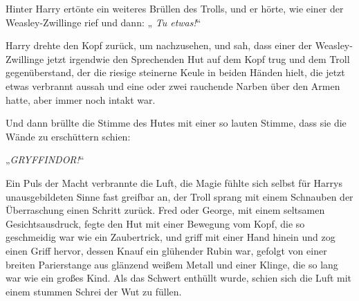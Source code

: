 Hinter Harry ertönte ein weiteres Brüllen des Trolls, und er hörte, wie einer der Weasley-Zwillinge  rief und dann:
„\emph{ Tu etwas!}“

Harry drehte den Kopf zurück, um nachzusehen, und sah, dass einer der Weasley-Zwillinge jetzt irgendwie den Sprechenden Hut auf dem Kopf trug und dem Troll gegenüberstand, der die riesige steinerne Keule in beiden Händen hielt, die jetzt etwas verbrannt aussah und eine oder zwei rauchende Narben über den Armen hatte, aber immer noch intakt war.

Und dann brüllte die Stimme des Hutes mit einer so lauten Stimme, dass sie die Wände zu erschüttern schien:

„\emph{GRYFFINDOR!}“

Ein Puls der Macht verbrannte die Luft, die Magie fühlte sich selbst für Harrys unausgebildeten Sinne fast greifbar an, der Troll sprang mit einem Schnauben der Überraschung einen Schritt zurück. Fred oder George, mit einem seltsamen Gesichtsausdruck, fegte den Hut mit einer Bewegung vom Kopf, die so geschmeidig war wie ein Zaubertrick, und griff mit einer Hand hinein und zog einen Griff hervor, dessen Knauf ein glühender Rubin war, gefolgt von einer breiten Parierstange aus glänzend weißem Metall und einer Klinge, die so lang war wie ein großes Kind. Als das Schwert enthüllt wurde, schien sich die Luft mit einem stummen Schrei der Wut zu füllen.

